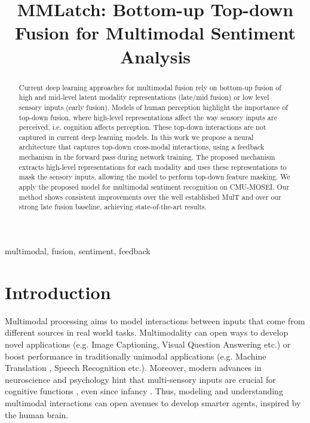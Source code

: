 \documentclass{article}
\title{MMLatch: Bottom-up Top-down Fusion for Multimodal Sentiment Analysis}
\begin{document}
\maketitle
\begin{abstract}
Current deep learning approaches for multimodal fusion rely on bottom-up fusion of high and mid-level latent modality representations (late/mid fusion) or low level sensory inputs (early fusion). 
Models of human perception highlight the importance of top-down fusion, where high-level representations affect the way sensory inputs are perceived, i.e. cognition affects perception. These top-down interactions are not captured in current deep learning models.
In this work we propose a neural architecture that captures top-down cross-modal interactions, using a feedback mechanism in the forward pass during network training.
The proposed mechanism extracts high-level representations for each modality and uses these representations to mask the sensory inputs, allowing the model to perform top-down feature masking.
We apply the proposed model for multimodal sentiment recognition on CMU-MOSEI.
Our method shows consistent improvements over the well established MulT and over our strong late fusion baseline, achieving state-of-the-art results.
\end{abstract}
\begin{keywords}
multimodal, fusion, sentiment, feedback
\end{keywords}


\section{Introduction}
\label{sec:intro}

Multimodal processing aims to model interactions between inputs that come from different sources in real world tasks.
Multimodality  
can open ways to develop novel applications (e.g. Image Captioning, Visual Question Answering 
\cite{antol2015vqa, you2016image} etc.) 
or boost performance in traditionally unimodal applications (e.g. Machine Translation \cite{caglayan-etal-2019-probing}, Speech Recognition \cite{paraskevopoulos-etal-2020-multimodal, srinivasan-etal-2020-multimodal} etc.).
Moreover, modern advances in neuroscience and psychology hint that multi-sensory inputs are crucial for cognitive functions \cite{KLEMEN2012111}, even since infancy \cite{neil2006development}.
Thus, modeling and understanding multimodal interactions can open avenues to develop smarter agents, inspired by the human brain.
\end{document}

